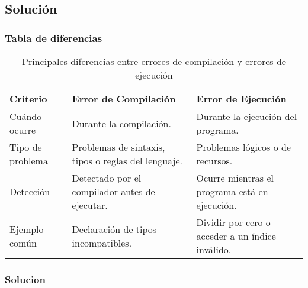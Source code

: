 \documentclass[a4paper,12pt]{article}
\begin{document}
    \subsection{Solución}

    \subsubsection{Tabla de diferencias}
    \begin{table}[H]
        \centering
        \begin{tabular}{|p{4cm}|p{6cm}|p{6cm}|}
            \hline
            \textbf{Criterio} & \textbf{Error de Compilación} & \textbf{Error de Ejecución} \\ \hline
            Cuándo ocurre & Durante la compilación. & Durante la ejecución del programa. \\ \hline
            Tipo de problema & Problemas de sintaxis, tipos o reglas del lenguaje. & Problemas lógicos o de recursos. \\ \hline
            Detección & Detectado por el compilador antes de ejecutar. & Ocurre mientras el programa está en ejecución. \\ \hline
            Ejemplo común & Declaración de tipos incompatibles. & Dividir por cero o acceder a un índice inválido. \\ \hline
        \end{tabular}
        \caption{Principales diferencias entre errores de compilación y errores de ejecución}
    \end{table}

    \subsubsection{Solucion}
    
\end{document}
